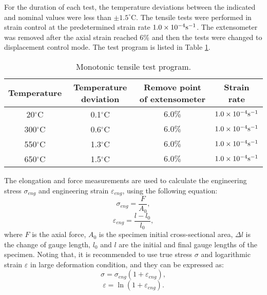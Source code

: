 For the duration of each test, the temperature deviations between the indicated and nominal values were less than $\pm1.5^{\circ}$C.
The tensile tests were performed in strain control at the predetermined strain rate $1.0\times 10^{-4}\rm{s}^{-1}$.
The extensometer was removed after the axial strain reached 6\% and then the tests were changed to displacement control mode.
The test program is listed in Table \ref{tab:TensionLoadingConditions}.
\begin{table}[htbp]
  \centering
  \caption{Monotonic tensile test program.}
    \begin{tabular}{cccc}
    \toprule
    Temperature & Temperature deviation & Remove point of extensometer  & Strain rate  \\
    \midrule
    20$^{\circ}$C  & 0.1$^{\circ}$C & $6.0\%$ & $1.0\times 10^{-4} \rm{s}^{-1}$ \\
    300$^{\circ}$C & 0.6$^{\circ}$C & $6.0\%$ & $1.0\times 10^{-4} \rm{s}^{-1}$ \\
    550$^{\circ}$C & 1.3$^{\circ}$C & $6.0\%$ & $1.0\times 10^{-4} \rm{s}^{-1}$ \\
    650$^{\circ}$C & 1.5$^{\circ}$C & $6.0\%$ & $1.0\times 10^{-4} \rm{s}^{-1}$ \\
    \bottomrule
    \end{tabular}%
  \label{tab:TensionLoadingConditions}%
\end{table}%

The elongation and force measurements are used to calculate the engineering stress $\sigma_{eng}$ and engineering strain $\varepsilon_{eng}$, using the following equation:
\begin{equation}
\sigma_{eng}=\frac{F}{A_0},
\end{equation}
\begin{equation}
\varepsilon_{eng}=\frac{l-l_0}{l_0},
\end{equation}
where $F$ is the axial force, $A_0$ is the specimen initial cross-sectional area, $\Delta l$ is the change of gauge length, $l_0$ and $l$ are the initial and final gauge lengths of the specimen.
Noting that, it is recommended to use true stress $\sigma$ and logarithmic strain $\varepsilon$ in large deformation condition, and they can be expressed as:
\begin{equation}
\sigma=\sigma_{eng}(1+\varepsilon_{eng}),
\end{equation}
\begin{equation}
\varepsilon=\ln(1+\varepsilon_{eng}).
\end{equation}

